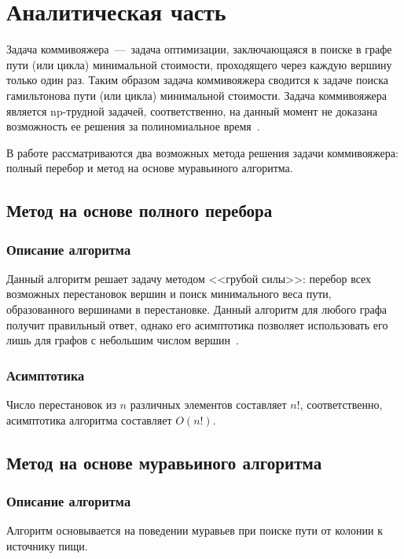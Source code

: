 \chapter{Аналитическая часть}

Задача коммивояжера~---~задача оптимизации, заключающаяся в поиске в графе пути (или цикла) минимальной стоимости, проходящего через каждую вершину только один раз. Таким образом задача коммивояжера сводится к задаче поиска гамильтонова пути (или цикла) минимальной стоимости. Задача коммивояжера является np-трудной задачей, соответственно, на данный момент не доказана возможность ее решения за полиномиальное время~\cite{Mudrov69}.

В работе рассматриваются два возможных метода решения задачи коммивояжера: полный перебор и метод на основе муравьиного алгоритма. 
\section{Метод на основе полного перебора}

\subsection{Описание алгоритма}

Данный алгоритм решает задачу методом <<грубой силы>>: перебор всех возможных перестановок вершин и поиск минимального веса пути, образованного вершинами в перестановке. Данный алгоритм для любого графа получит правильный ответ, однако его асимптотика позволяет использовать его лишь для графов с небольшим числом вершин~\cite{Levitin06}.

\subsection{Асимптотика}

Число перестановок из $n$ различных элементов составляет $n!$, соответственно, асимптотика алгоритма составляет $O(n!)$.

\section{Метод на основе муравьиного алгоритма}

\subsection{Описание алгоритма}

Алгоритм основывается на поведении муравьев при поиске пути от колонии к источнику пищи. 

